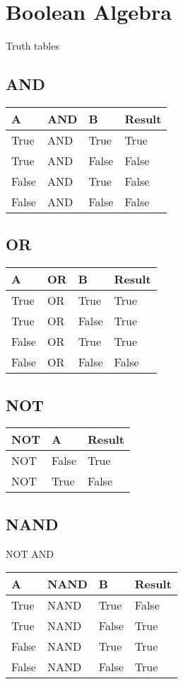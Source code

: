 \documentclass[11pt]{article}
\begin{document}
\section{Boolean Algebra}
Truth tables

\subsection{AND}
\begin{tabular}{lll|l}
A & AND & B & Result \\
\hline
True & AND & True & True \\
True & AND & False & False \\
False & AND & True & False \\
False & AND & False & False \\
\hline
\end{tabular}

\subsection{OR}
\begin{tabular}{lll|l}
A & OR &B & Result \\
\hline
True & OR & True & True \\
True & OR & False & True \\
False & OR & True & True \\
False & OR & False & False \\
\hline
\end{tabular}

\subsection{NOT}
\begin{tabular}{ll|l}
NOT & A & Result \\
\hline
NOT & False & True \\
NOT & True & False \\

\hline
\end{tabular}


\subsection{NAND}
NOT AND

\begin{tabular}{lll|l}
A & NAND & B & Result \\
\hline
True & NAND & True & False \\
True & NAND & False & True \\
False & NAND & True & True \\
False & NAND & False & True \\
\hline
\end{tabular}
\end{document}
